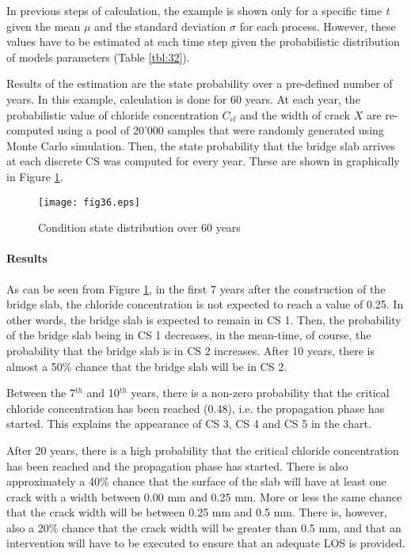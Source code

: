 In previous steps of calculation, the example is shown only for a specific time \textit{t} given the mean $\mu$ and the standard deviation $\sigma$ for each process. However, these values have to be estimated at each time step given the probabilistic distribution of models parameters (Table \ref{tbl:32}).

Results of the estimation are the state probability over a pre-defined number of years. In this example, calculation is done for 60 years. At each year, the probabilistic value of chloride concentration ${C_{cl}}$ and the width of crack $X$ are re-computed using a pool of 20'000 samples that were randomly generated using Monte Carlo simulation. Then, the state probability that the bridge slab arrives at each discrete CS was computed for every year. These are shown in graphically in Figure \ref{fig:36}. 

\begin{figure}[h]
\texttt{[image: fig36.eps]}
\caption{Condition state distribution over 60 years}\label{fig:36}
\end{figure}
 
\paragraph{Results}

As can be seen from Figure \ref{fig:36}, in the first 7 years after the construction of the bridge slab, the chloride concentration is not expected to reach a value of 0.25. In other words, the bridge slab is expected to remain in CS 1. Then, the probability of the bridge slab being in CS 1 decreases, in the mean-time, of course, the probability that the bridge slab is in CS 2 increases. After 10 years, there is almost a 50\% chance that the bridge slab will be in CS 2.

Between the 7$^{th}$ and 10$^{th}$ years, there is a non-zero probability that the critical chloride concentration has been reached (0.48), i.e. the propagation phase has started. This explains the appearance of CS 3, CS 4 and CS 5 in the chart.

After 20 years, there is a high probability that the critical chloride concentration has been reached and the propagation phase has started. There is also approximately a 40\% chance that the surface of the slab will have at least one crack with a width between 0.00 mm and 0.25 mm. More or less the same chance that the crack width will be between 0.25 mm and 0.5 mm. There is, however, also a 20\% chance that the crack width will be greater than 0.5 mm, and that an intervention will have to be executed to ensure that an adequate LOS is provided.

